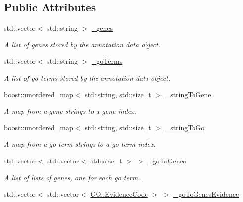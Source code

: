 \subsection*{Public Attributes}
\begin{DoxyCompactItemize}
\item 
std\+::vector$<$ std\+::string $>$ \hyperlink{classAnnotationData_a9f25041cb6cfabe964e2857b54400a3b}{\+\_\+genes}
\begin{DoxyCompactList}\small\item\em A list of genes stored by the annotation data object. \end{DoxyCompactList}\item 
std\+::vector$<$ std\+::string $>$ \hyperlink{classAnnotationData_a88170d72e7addb555701e7aeba30f588}{\+\_\+go\+Terms}
\begin{DoxyCompactList}\small\item\em A list of go terms stored by the annotation data object. \end{DoxyCompactList}\item 
boost\+::unordered\+\_\+map$<$ std\+::string, std\+::size\+\_\+t $>$ \hyperlink{classAnnotationData_a2246453b69594c15745d47f6c3c4c533}{\+\_\+string\+To\+Gene}
\begin{DoxyCompactList}\small\item\em A map from a gene strings to a gene index. \end{DoxyCompactList}\item 
boost\+::unordered\+\_\+map$<$ std\+::string, std\+::size\+\_\+t $>$ \hyperlink{classAnnotationData_ab743686bf79303fbc0eb16c323d1b104}{\+\_\+string\+To\+Go}
\begin{DoxyCompactList}\small\item\em A map from a go term strings to a go term index. \end{DoxyCompactList}\item 
std\+::vector$<$ std\+::vector$<$ std\+::size\+\_\+t $>$ $>$ \hyperlink{classAnnotationData_a72a19fdf14001e241bd0dc200c5fd0de}{\+\_\+go\+To\+Genes}
\begin{DoxyCompactList}\small\item\em A list of lists of genes, one for each go term. \end{DoxyCompactList}\item 
std\+::vector$<$ std\+::vector$<$ \hyperlink{namespaceGO_a4ce5387bbcdaec3648957c7903f2caf3}{G\+O\+::\+Evidence\+Code} $>$ $>$ \hyperlink{classAnnotationData_afdad9a39d18deaf76fae099554caf86e}{\+\_\+go\+To\+Genes\+Evidence}

\end{DoxyCompactItemize}
